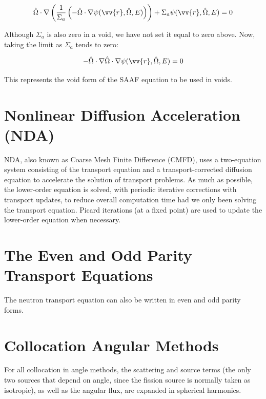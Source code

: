 \documentclass[10pt]{article}
\newcommand{\hO}{\hat{\Omega}}
\begin{document}
\begin{flushleft}
\begin{equation}
\label{eq:SAAFvoid1}
\hO   \cdot \nabla \left( \frac{1}{\Sigma_a}\left(-\hO  \cdot\nabla\psi(\vv{r}, \hO  , E)\right)\right) + \Sigma_a\psi(\vv{r}, \hO  , E) = 0
\end{equation}

Although \(\Sigma_a\) is also zero in a void, we have not set it equal to zero above. Now, taking the limit as \(\Sigma_a\) tends to zero:

\begin{equation}
\label{eq:SAAFvoid2}
-\hO   \cdot \nabla\hO  \cdot\nabla\psi(\vv{r}, \hO  , E) = 0
\end{equation}

This represents the void form of the SAAF equation to be used in voids.




\section{Nonlinear Diffusion Acceleration (NDA)}


NDA, also known as Coarse Mesh Finite Difference (CMFD), uses a two-equation system consisting of the transport equation and a transport-corrected diffusion equation to accelerate the solution of transport problems. As much as possible, the lower-order equation is solved, with periodic iterative corrections with transport updates, to reduce overall computation time had we only been solving the transport equation. Picard iterations (at a fixed point) are used to update the lower-order equation when necessary. 




\section{The Even and Odd Parity Transport Equations}

The neutron transport equation can also be written in even and odd parity forms.





\section{Collocation Angular Methods}

For all collocation in angle methods, the scattering and source terms (the only two sources that depend on angle, since the fission source is normally taken as isotropic), as well as the angular flux, are expanded in spherical harmonics. 


\end{flushleft}
\end{document}
